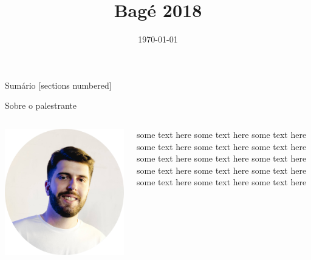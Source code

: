 \documentclass{beamer}
\title{Bagé 2018}
\date{\today}
\begin{document}
	
	\begin{frame}{}
		\titlepage
		\thispagestyle{empty}
	\end{frame}
	
	\begin{frame}{Sumário}
		[sections numbered]
		\tableofcontents[hideallsubsections]
	\end{frame}

	\begin{frame}{Sobre o palestrante}
	
		\begin{columns}
			\begin{column}{0.5\textwidth}
				\includegraphics[scale = 0.05]{fig/fig_eu.png}
			\end{column}
			\begin{column}{0.5\textwidth}  %
				some text here some text here some text here some text here some text here
				some text here some text here some text here some text here some text here
				some text here some text here some text here some text here some text here
			\end{column}
		\end{columns}
		
	\end{frame}
\end{document}
